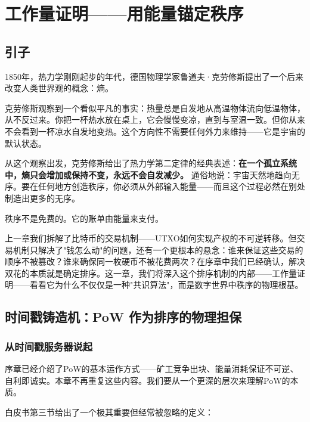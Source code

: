 \documentclass[a4paper,12pt,openany]{ctexbook}
\begin{document}
\chapter{工作量证明——用能量锚定秩序}



\section*{引子}


1850年，热力学刚刚起步的年代，德国物理学家鲁道夫·克劳修斯提出了一个后来改变人类世界观的概念：熵。

克劳修斯观察到一个看似平凡的事实：热量总是自发地从高温物体流向低温物体，从不反过来。你把一杯热水放在桌上，它会慢慢变凉，直到与室温一致。但你从来不会看到一杯凉水自发地变热。这个方向性不需要任何外力来维持——它是宇宙的默认状态。

从这个观察出发，克劳修斯给出了热力学第二定律的经典表述：\textbf{在一个孤立系统中，熵只会增加或保持不变，永远不会自发减少。} 通俗地说：宇宙天然地趋向无序。要在任何地方创造秩序，你必须从外部输入能量——而且这个过程必然在别处制造出更多的无序。

秩序不是免费的。它的账单由能量来支付。

上一章我们拆解了比特币的交易机制——UTXO如何实现产权的不可逆转移。但交易机制只解决了"钱怎么动"的问题，还有一个更根本的悬念：谁来保证这些交易的顺序不被篡改？谁来确保同一枚硬币不被花费两次？在序章中我们已经确认，解决双花的本质就是确定排序。这一章，我们将深入这个排序机制的内部——工作量证明——看看它为什么不仅仅是一种"共识算法"，而是数字世界中秩序的物理根基。


\section*{时间戳铸造机：PoW 作为排序的物理担保}



\subsection*{从时间戳服务器说起}


序章已经介绍了PoW的基本运作方式——矿工竞争出块、能量消耗保证不可逆、自利即诚实。本章不再重复这些内容。我们要从一个更深的层次来理解PoW的本质。

白皮书第三节给出了一个极其重要但经常被忽略的定义：
\end{document}
